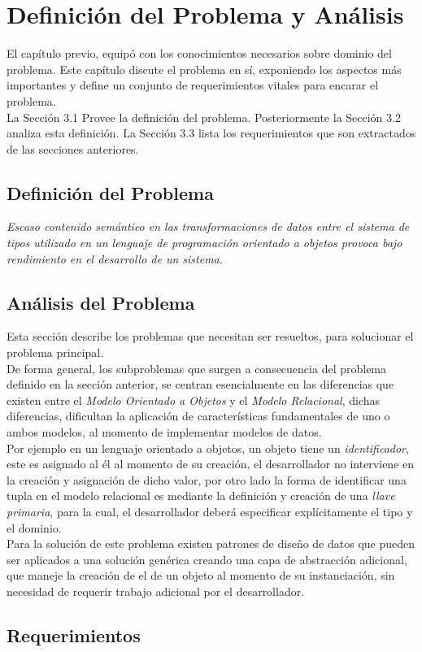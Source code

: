 
\chapter{Definición del Problema y Análisis}
\noindent El capítulo previo, equipó con los conocimientos necesarios sobre dominio del problema.
\noindent Este capítulo discute el problema en sí, exponiendo los aspectos más importantes y define un conjunto
\noindent de requerimientos vitales para encarar el problema.\\
\indent    La Sección 3.1 Provee la definición del problema.
\noindent Posteriormente la Sección 3.2 analiza esta definición. La Sección 3.3 lista los requerimientos
\noindent que son extractados de las secciones anteriores.
\section{Definición del Problema}
\noindent \textit{Escaso contenido semántico en las transformaciones de datos entre el sistema de tipos
                    utilizado en un lenguaje de programación orientado a objetos provoca bajo rendimiento
                    en el desarrollo de un sistema.}

\section{Análisis del Problema}
\noindent Esta sección describe los problemas que necesitan ser resueltos, para solucionar el problema principal.\\
\indent De forma general, los subproblemas que surgen a consecuencia del problema definido en la sección anterior,
\noindent se centran esencialmente en las diferencias que existen entre el \textit{Modelo Orientado a Objetos} y el
\noindent \textit{Modelo Relacional}, dichas diferencias, dificultan la aplicación de características fundamentales
\noindent de uno o ambos modelos, al momento de implementar modelos de datos.\\ Por ejemplo en un lenguaje orientado a objetos,
\noindent un objeto tiene un \textit{identificador}, este es asignado al él al momento de su creación, el desarrollador no
\noindent interviene en la creación y asignación de dicho valor, por otro lado la forma de identificar una tupla en el modelo
\noindent relacional es mediante la definición y creación de una \textit{llave primaria}, para la cual, el desarrollador deberá
\noindent especificar explícitamente el tipo y el dominio.\\ Para la solución de este problema existen patrones de diseño
\noindent de datos que pueden ser aplicados a una solución genérica creando una capa de abstracción adicional, que maneje
\noindent la creación de el  de un objeto al momento de su instanciación, sin necesidad de requerir
\noindent trabajo adicional por el desarrollador.
\section{Requerimientos}
